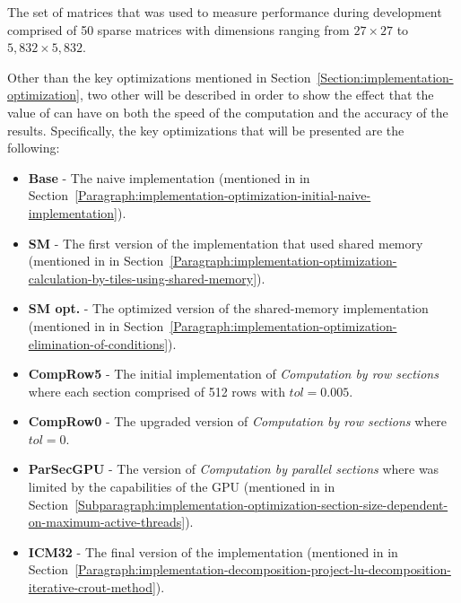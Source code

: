 The set of matrices that was used to measure performance during development comprised of 50 sparse matrices with dimensions ranging from $ 27\times 27 $ to $ 5,832\times 5,832 $.
\par Other than the key optimizations mentioned in Section~\ref{Section:implementation-optimization}, two other will be described in order to show the effect that the value of  can have on both the speed of the computation and the accuracy of the results. Specifically, the key optimizations that will be presented are the following:

\begin{itemize}
	\item \textbf{Base} - The naive implementation (mentioned in \textit{} in Section~\ref{Paragraph:implementation-optimization-initial-naive-implementation}).
	\item \textbf{SM} - The first version of the implementation that used shared memory (mentioned in \textit{} in Section~\ref{Paragraph:implementation-optimization-calculation-by-tiles-using-shared-memory}).
	\item \textbf{SM opt.} - The optimized version of the shared-memory implementation (mentioned in \textit{} in Section~\ref{Paragraph:implementation-optimization-elimination-of-conditions}).
	\item \textbf{CompRow5} - The initial implementation of \textit{Computation by row sections} where each section comprised of 512 rows with $ tol = 0.005 $.
	\item \textbf{CompRow0} - The upgraded version of \textit{Computation by row sections} where $ tol = 0 $.
	\item \textbf{ParSecGPU} - The version of \textit{Computation by parallel sections} where  was limited by the capabilities of the GPU (mentioned in \textit{} in Section~\ref{Subparagraph:implementation-optimization-section-size-dependent-on-maximum-active-threads}).
	\item \textbf{ICM32} - The final version of the implementation (mentioned in \textit{} in Section~\ref{Paragraph:implementation-decomposition-project-lu-decomposition-iterative-crout-method}).
\end{itemize}


